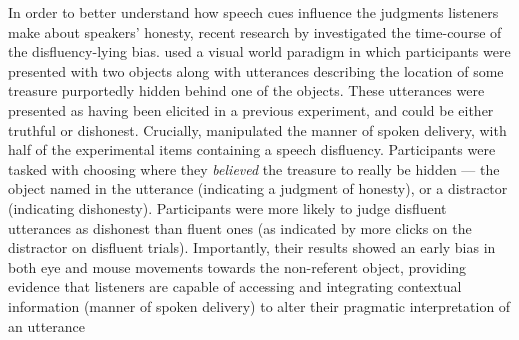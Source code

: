 \documentclass[a4paper,man,natbib]{apa6}
\begin{document}
In order to better understand how speech cues influence the judgments listeners make about speakers' honesty, recent research by \citet{Loy2017} investigated the time-course of the disfluency-lying bias.
\citet{Loy2017} used a visual world paradigm in which participants were presented with two objects along with utterances describing the location of some treasure purportedly hidden behind one of the objects. %
These utterances were presented as having been elicited in a previous experiment, and could be either truthful or dishonest.
Crucially, \citet{Loy2017} manipulated the manner of spoken delivery, with half of the experimental items containing a speech disfluency. %
Participants were tasked with choosing where they \textit{believed} the treasure to really be hidden --- the object named in the utterance (indicating a judgment of honesty), or a distractor (indicating dishonesty).
Participants were more likely to judge disfluent utterances as dishonest than fluent ones (as indicated by more clicks on the distractor on disfluent trials). %
Importantly, their results showed an early bias in both eye and mouse movements towards the non-referent object, providing evidence that listeners are capable of accessing and integrating contextual information (manner of spoken delivery) to alter their pragmatic interpretation of an utterance %
\end{document}

